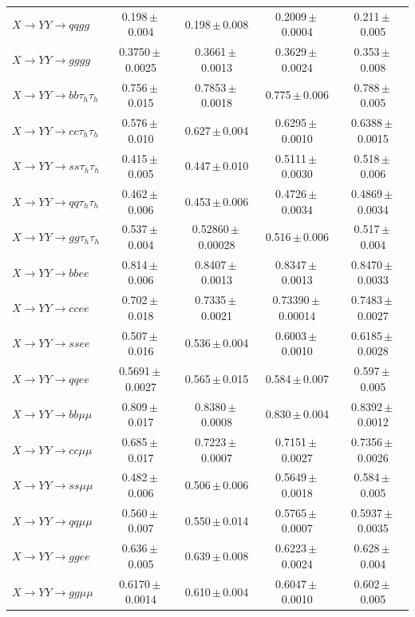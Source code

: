 \documentclass[12pt]{article}   %
\begin{document}
\begin{landscape}
{\begin{longtable}{@{\extracolsep{\fill}}lcccc@{}}
$X\to YY\to qqgg$ & 0.198\,$\pm$\,0.004 & 0.198\,$\pm$\,0.008 & 0.2009\,$\pm$\,0.0004 & 0.211\,$\pm$\,0.005 \\
$X\to YY\to gggg$ & 0.3750\,$\pm$\,0.0025 & 0.3661\,$\pm$\,0.0013 & 0.3629\,$\pm$\,0.0024 & 0.353\,$\pm$\,0.008 \\
\midrule
$X\to YY\to bb\tau_h\tau_h$ & 0.756\,$\pm$\,0.015 & 0.7853\,$\pm$\,0.0018 & 0.775\,$\pm$\,0.006 & 0.788\,$\pm$\,0.005 \\
$X\to YY\to cc\tau_h\tau_h$ & 0.576\,$\pm$\,0.010 & 0.627\,$\pm$\,0.004 & 0.6295\,$\pm$\,0.0010 & 0.6388\,$\pm$\,0.0015 \\
$X\to YY\to ss\tau_h\tau_h$ & 0.415\,$\pm$\,0.005 & 0.447\,$\pm$\,0.010 & 0.5111\,$\pm$\,0.0030 & 0.518\,$\pm$\,0.006 \\
$X\to YY\to qq\tau_h\tau_h$ & 0.462\,$\pm$\,0.006 & 0.453\,$\pm$\,0.006 & 0.4726\,$\pm$\,0.0034 & 0.4869\,$\pm$\,0.0034 \\
$X\to YY\to gg\tau_h\tau_h$ & 0.537\,$\pm$\,0.004 & 0.52860\,$\pm$\,0.00028 & 0.516\,$\pm$\,0.006 & 0.517\,$\pm$\,0.004 \\
\midrule
$X\to YY\to bbee$ & 0.814\,$\pm$\,0.006 & 0.8407\,$\pm$\,0.0013 & 0.8347\,$\pm$\,0.0013 & 0.8470\,$\pm$\,0.0033 \\
$X\to YY\to ccee$ & 0.702\,$\pm$\,0.018 & 0.7335\,$\pm$\,0.0021 & 0.73390\,$\pm$\,0.00014 & 0.7483\,$\pm$\,0.0027 \\
$X\to YY\to ssee$ & 0.507\,$\pm$\,0.016 & 0.536\,$\pm$\,0.004 & 0.6003\,$\pm$\,0.0010 & 0.6185\,$\pm$\,0.0028 \\
$X\to YY\to qqee$ & 0.5691\,$\pm$\,0.0027 & 0.565\,$\pm$\,0.015 & 0.584\,$\pm$\,0.007 & 0.597\,$\pm$\,0.005 \\
$X\to YY\to bb\mu\mu$ & 0.809\,$\pm$\,0.017 & 0.8380\,$\pm$\,0.0008 & 0.830\,$\pm$\,0.004 & 0.8392\,$\pm$\,0.0012 \\
$X\to YY\to cc\mu\mu$ & 0.685\,$\pm$\,0.017 & 0.7223\,$\pm$\,0.0007 & 0.7151\,$\pm$\,0.0027 & 0.7356\,$\pm$\,0.0026 \\
$X\to YY\to ss\mu\mu$ & 0.482\,$\pm$\,0.006 & 0.506\,$\pm$\,0.006 & 0.5649\,$\pm$\,0.0018 & 0.584\,$\pm$\,0.005 \\
$X\to YY\to qq\mu\mu$ & 0.560\,$\pm$\,0.007 & 0.550\,$\pm$\,0.014 & 0.5765\,$\pm$\,0.0007 & 0.5937\,$\pm$\,0.0035 \\
$X\to YY\to ggee$ & 0.636\,$\pm$\,0.005 & 0.639\,$\pm$\,0.008 & 0.6223\,$\pm$\,0.0024 & 0.628\,$\pm$\,0.004 \\
$X\to YY\to gg\mu\mu$ & 0.6170\,$\pm$\,0.0014 & 0.610\,$\pm$\,0.004 & 0.6047\,$\pm$\,0.0010 & 0.602\,$\pm$\,0.005 \\

\end{longtable}}
\end{landscape}
\end{document}
